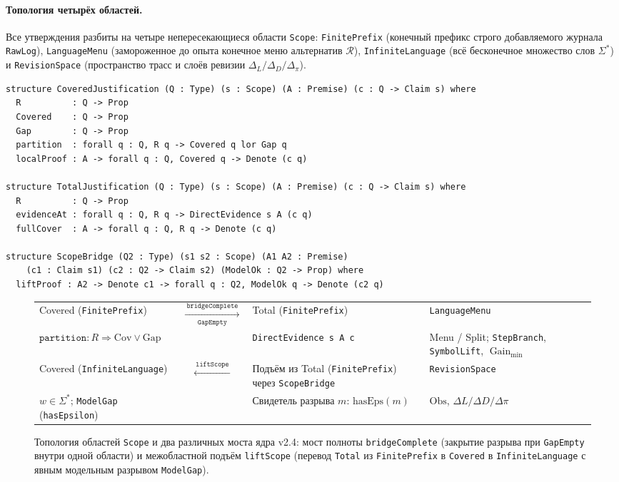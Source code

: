 \documentclass[11pt,a4paper]{article}
\theoremstyle{preprintthm}
\theoremstyle{preprintdef}
\newcommand{\calR}{\mathcal{R}}
\newcommand{\Gain}{\operatorname{Gain}}
\begin{document}
\paragraph{Топология четырёх областей.}
Все утверждения разбиты на четыре непересекающиеся области \texttt{Scope}: \texttt{FinitePrefix} (конечный префикс строго добавляемого журнала \texttt{RawLog}), \texttt{LanguageMenu} (замороженное до опыта конечное меню альтернатив $\calR$), \texttt{InfiniteLanguage} (всё бесконечное множество слов $\Sigma^*$) и \texttt{RevisionSpace} (пространство трасс и слоёв ревизии $\Delta_L/\Delta_D/\Delta_\pi$).

\begin{lstlisting}[caption={Верифицированное ядро v2.4 (Lean~4.36.0): точечно-зависимые утверждения $c:Q\to\texttt{Claim } s$, поточечный \texttt{evidenceAt} и условный \texttt{ScopeBridge}.}]
structure CoveredJustification (Q : Type) (s : Scope) (A : Premise) (c : Q -> Claim s) where
  R          : Q -> Prop
  Covered    : Q -> Prop
  Gap        : Q -> Prop
  partition  : forall q : Q, R q -> Covered q lor Gap q
  localProof : A -> forall q : Q, Covered q -> Denote (c q)

structure TotalJustification (Q : Type) (s : Scope) (A : Premise) (c : Q -> Claim s) where
  R          : Q -> Prop
  evidenceAt : forall q : Q, R q -> DirectEvidence s A (c q)
  fullCover  : A -> forall q : Q, R q -> Denote (c q)

structure ScopeBridge (Q2 : Type) (s1 s2 : Scope) (A1 A2 : Premise)
    (c1 : Claim s1) (c2 : Q2 -> Claim s2) (ModelOk : Q2 -> Prop) where
  liftProof : A2 -> Denote c1 -> forall q : Q2, ModelOk q -> Denote (c2 q)
\end{lstlisting}

\begin{figure}[!htbp]
\centering
\begingroup\footnotesize
\begin{tabularx}{\linewidth}{@{}XcXX@{}}
\toprule
Covered (\texttt{FinitePrefix}) &
$\xrightarrow[\texttt{GapEmpty}]{\ \texttt{bridgeComplete}\ }$ &
Total (\texttt{FinitePrefix}) & \texttt{LanguageMenu}\\
$\texttt{partition}:R\Rightarrow\mathrm{Cov}\lor\mathrm{Gap}$ &&
\texttt{DirectEvidence s A c} &
Menu / Split; \texttt{StepBranch}, \texttt{SymbolLift}, $\Gain_{\min}$\\
\midrule
Covered (\texttt{InfiniteLanguage}) &
$\xleftarrow{\ \texttt{liftScope}\ }$ &
Подъём из Total (\texttt{FinitePrefix}) через \texttt{ScopeBridge} &
\texttt{RevisionSpace}\\
$w\in\Sigma^*$; \texttt{ModelGap} (\texttt{hasEpsilon}) &&
Свидетель разрыва $m$: $\mathrm{hasEps}(m)$ &
$\mathrm{Obs}$, $\Delta L/\Delta D/\Delta\pi$\\
\bottomrule
\end{tabularx}
\endgroup
\caption{Топология областей \texttt{Scope} и два различных моста ядра v2.4: мост полноты \texttt{bridgeComplete} (закрытие разрыва при \texttt{GapEmpty} внутри одной области) и межобластной подъём \texttt{liftScope} (перевод \texttt{Total} из \texttt{FinitePrefix} в \texttt{Covered} в \texttt{InfiniteLanguage} с явным модельным разрывом \texttt{ModelGap}).}
\label{fig:scope_lattice}
\end{figure}
\end{document}
